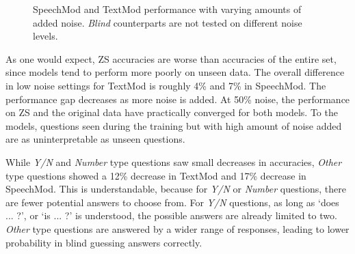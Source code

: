 \documentclass[letterpaper]{article} %
\begin{document}
\pgfplotsset{width=8cm,compat=1.9}
\begin{figure}[t]
\centering
{}
\caption{SpeechMod and TextMod performance with varying amounts of added noise. \textit{Blind} counterparts are not tested on different noise levels.}
\label{fig:noiseplots-zs}
\end{figure}



As one would expect, ZS accuracies are worse than accuracies of the entire set, since models tend to perform more poorly on unseen data. The overall difference in low noise settings for TextMod is roughly 4\% and 7\% in SpeechMod. The performance gap decreases as more noise is added. At 50\% noise, the performance on ZS and the original data have practically converged for both models. To the models, questions seen during the training but with high amount of noise added are as uninterpretable as unseen questions.

While \textit{Y/N} and \textit{Number} type questions saw small decreases in accuracies, \textit{Other} type questions showed a 12\% decrease in TextMod and 17\% decrease in SpeechMod. This is understandable, because for \textit{Y/N} or \textit{Number} questions, there are fewer potential answers to choose from. For \textit{Y/N} questions, as long as `does ... ?', or `is ... ?' is understood, the possible answers are already limited to two. \textit{Other} type questions are answered by a wider range of responses, leading to lower probability in blind guessing answers correctly.
\end{document}

